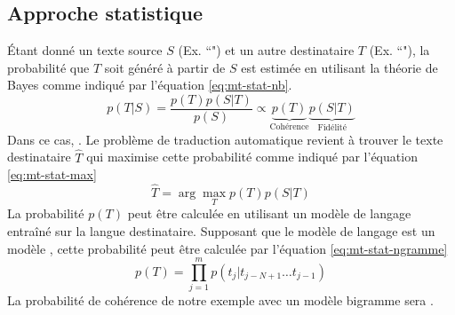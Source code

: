 \documentclass{KodeBook}
\begin{document}
\subsection{Approche statistique}

Étant donné un texte source $S$ (Ex. ``") et un autre destinataire $T$ (Ex. ``"), la probabilité que $T$ soit généré à partir de $S$ est estimée en utilisant la théorie de Bayes comme indiqué par l'équation \ref{eq:mt-stat-nb}.
\begin{equation}\label{eq:mt-stat-nb} 
p(T|S) = \frac{p(T) p(S|T)}{p(S)} \propto \underbrace{p(T)}_\text{Cohérence} \underbrace{p(S|T)}_\text{Fidélité}
\end{equation}
Dans ce cas, .
Le problème de traduction automatique revient à trouver le texte destinataire $\hat{T}$ qui maximise cette probabilité comme indiqué par l'équation \ref{eq:mt-stat-max}
\begin{equation}\label{eq:mt-stat-max} 
\hat{T} = \arg\max_{T} p(T) p(S|T)
\end{equation}
La probabilité $p(T)$ peut être calculée en utilisant un modèle de langage entraîné sur la langue destinataire. 
Supposant que le modèle de langage est un modèle , cette probabilité peut être calculée par l'équation \ref{eq:mt-stat-ngramme}
\begin{equation}\label{eq:mt-stat-ngramme} 
p(T) = \prod_{j=1}^m p(t_j|t_{j-N+1}\ldots t_{j-1})
\end{equation}
La probabilité de cohérence de notre exemple avec un modèle bigramme sera .
\end{document}
